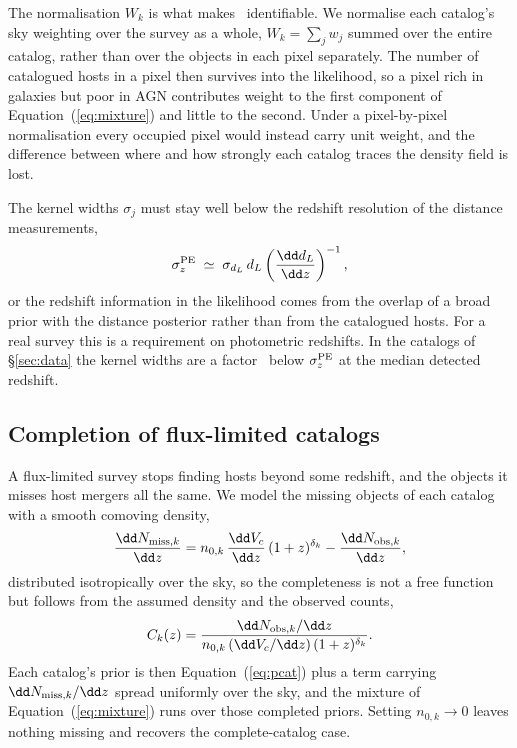 The normalisation $W_k$ is what makes \fagn\ identifiable. We normalise each
catalog's sky weighting over the survey as a whole, $W_k = \sum_j w_j$ summed
over the entire catalog, rather than over the objects in each pixel separately.
The number of catalogued hosts in a pixel then survives into the likelihood, so
a pixel rich in galaxies but poor in AGN contributes weight to the first
component of Equation~(\ref{eq:mixture}) and little to the second. Under a
pixel-by-pixel normalisation every occupied pixel would instead carry unit
weight, and the difference between where and how strongly each catalog traces
the density field is lost.

The kernel widths $\sigma_j$ must stay well below the redshift resolution of
the distance measurements,
\begin{equation}
  \sigma_z^{\rm PE} \;\simeq\; \sigma_{d_L}\, d_L \left(
     \frac{\dd d_L}{\dd z} \right)^{-1},
  \label{eq:sigmazpe}
\end{equation}
or the redshift information in the likelihood comes from the overlap of a broad
prior with the distance posterior rather than from the catalogued hosts. For a
real survey this is a requirement on photometric redshifts. In the catalogs of
\S\ref{sec:data} the kernel widths are a factor \KdePeRatio\ below
$\sigma_z^{\rm PE}$ at the median detected redshift.

\subsection{Completion of flux-limited catalogs}
\label{sec:methods:completion}

A flux-limited survey stops finding hosts beyond some redshift, and the objects
it misses host mergers all the same. We model the missing objects of each
catalog with a smooth comoving density,
\begin{equation}
  \frac{\dd N_{{\rm miss},k}}{\dd z} =
    n_{0,k}\, \frac{\dd V_c}{\dd z}\, (1+z)^{\delta_k}
    - \frac{\dd N_{{\rm obs},k}}{\dd z},
  \label{eq:miss}
\end{equation}
distributed isotropically over the sky, so the completeness is not a free
function but follows from the assumed density and the observed counts,
\begin{equation}
  C_k(z) = \frac{\dd N_{{\rm obs},k}/\dd z}
                {n_{0,k}\, (\dd V_c/\dd z)\, (1+z)^{\delta_k}}.
  \label{eq:completeness}
\end{equation}
Each catalog's prior is then Equation~(\ref{eq:pcat}) plus a term carrying
$\dd N_{{\rm miss},k}/\dd z$ spread uniformly over the sky, and the mixture of
Equation~(\ref{eq:mixture}) runs over those completed priors. Setting
$n_{0,k} \rightarrow 0$ leaves nothing missing and recovers the
complete-catalog case.

